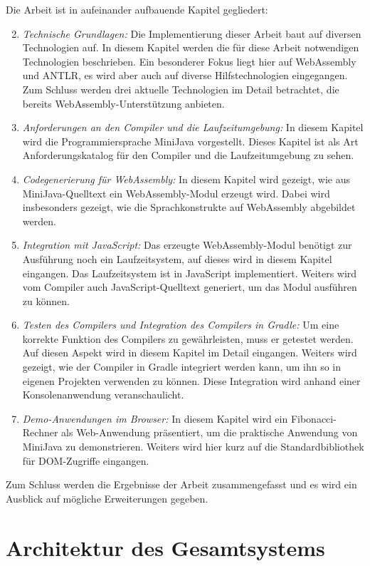 Die Arbeit ist in aufeinander aufbauende Kapitel gegliedert:
\begin{enumerate}
    \setcounter{enumi}{1}
    \item \emph{Technische Grundlagen:} Die Implementierung dieser Arbeit baut auf diversen Technologien auf. In diesem Kapitel werden die für diese Arbeit notwendigen Technologien beschrieben. Ein besonderer Fokus liegt hier auf WebAssembly und ANTLR, es wird aber auch auf diverse Hilfstechnologien eingegangen. Zum Schluss werden drei aktuelle Technologien im Detail betrachtet, die bereits WebAssembly-Unterstützung anbieten.
    \item \emph{Anforderungen an den Compiler und die Laufzeitumgebung:} In diesem Kapitel wird die Programmiersprache MiniJava vorgestellt. Dieses Kapitel ist als Art Anforderungskatalog für den Compiler und die Laufzeitumgebung zu sehen.
    \item \emph{Codegenerierung für WebAssembly:} In diesem Kapitel wird gezeigt, wie aus Mi\-ni\-Ja\-va-Quell\-text ein WebAssembly-Modul erzeugt wird. Dabei wird insbesonders gezeigt, wie die Sprachkonstrukte auf WebAssembly abgebildet werden. 
    \item \emph{Integration mit JavaScript:} Das erzeugte WebAssembly-Modul benötigt zur Ausführung noch ein Laufzeitsystem, auf dieses wird in diesem Kapitel eingangen. Das Laufzeitsystem ist in JavaScript implementiert. Weiters wird vom Compiler auch JavaScript-Quelltext generiert, um das Modul ausführen zu können.
    \item \emph{Testen des Compilers und Integration des Compilers in Gradle:} Um eine korrekte Funktion des Compilers zu gewährleisten, muss er getestet werden. Auf diesen Aspekt wird in diesem Kapitel im Detail eingangen. Weiters wird gezeigt, wie der Compiler in Gradle integriert werden kann, um ihn so in eigenen Projekten verwenden zu können. Diese Integration wird anhand einer Konsolenanwendung veranschaulicht.
    \item \emph{Demo-Anwendungen im Browser:} In diesem Kapitel wird ein Fibonacci-Rechner als Web-Anwendung präsentiert, um die praktische Anwendung von MiniJava zu demonstrieren. Weiters wird hier kurz auf die Standardbibliothek für DOM-Zugriffe eingangen.
\end{enumerate}

Zum Schluss werden die Ergebnisse der Arbeit zusammengefasst und es wird ein Ausblick auf mögliche Erweiterungen gegeben.

\pagebreak
\section{Architektur des Gesamtsystems}

